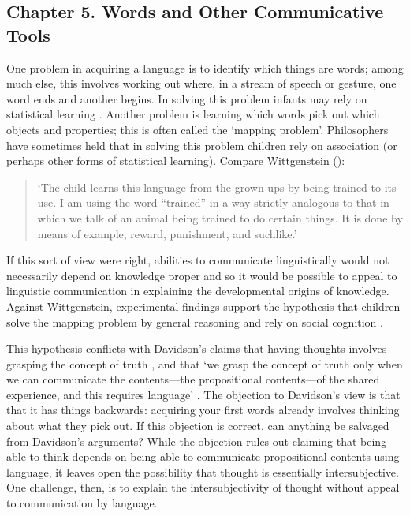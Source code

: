 \documentclass[12pt,\papersize]{extarticle}
\begin{document}
\subsection{Chapter 5. Words and Other Communicative Tools}
One problem in acquiring a language is to identify which things are words; among much else, this involves working out where, in a stream of speech or gesture, one word ends and another begins.  
In solving this problem infants may rely on statistical learning \citep{Saffran:1996aj}.
Another problem is learning which words pick out which objects and properties; this is often called the `mapping problem'. 
Philosophers have sometimes held that in solving this problem children rely on association (or perhaps other forms of statistical learning).
Compare Wittgenstein (\citeyear[p.\ 77]{Wittgenstein:1972lj}): 
%
\begin{quote}
`The child learns this language from the grown-ups by being trained to its use. I am using the word ``trained'' in a way strictly analogous to that in which we talk of an animal being trained to do certain things. It is done by means of example, reward, punishment, and suchlike.'
\end{quote}
%
If this sort of view were right, abilities to communicate linguistically would not necessarily depend on knowledge proper and so it would be possible to appeal to linguistic communication in explaining the developmental origins of knowledge.
Against Wittgenstein, experimental findings support the hypothesis that children solve the mapping problem by general reasoning and rely on social cognition
\citep{Baldwin:1995xl,Bloom:2000qz,Sabbagh:2001sp}. 

This hypothesis conflicts with Davidson's claims that having thoughts involves grasping the concept of truth \citep[p.\ 189]{Davidson:2001sm}, 
and that `we grasp the concept of truth only when we can communicate the contents—the propositional contents—of the shared experience, and this requires language' \citep[p.\ 27]{Davidson:1997wj}.
The objection to Davidson's view is that that it has things backwards: acquiring your first words already involves thinking about what they pick out. 
If this objection is correct, can anything be salvaged from Davidson's arguments? 
While the objection rules out claiming that being able to think depends on being able to communicate propositional contents using language, it leaves open the possibility that thought is essentially intersubjective.
One challenge, then, is to explain the intersubjectivity of thought without appeal to communication by language.
\end{document}
